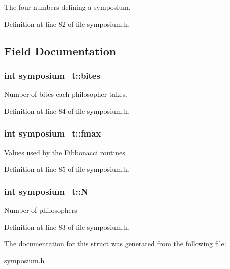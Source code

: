 The four numbers defining a symposium. 

Definition at line 82 of file symposium.\-h.



\subsection{Field Documentation}
\hypertarget{structsymposium__t_a9ee1b978200b8a4b7c30b170c1f20643}{
\subsubsection[{bites}]{\setlength{\rightskip}{0pt plus 5cm}int symposium\-\_\-t\-::bites}}\label{structsymposium__t_a9ee1b978200b8a4b7c30b170c1f20643}
Number of bites each philosopher takes. 

Definition at line 84 of file symposium.\-h.

\hypertarget{structsymposium__t_a038b49a350225fed31d5c148a9147ec6}{
\subsubsection[{fmax}]{\setlength{\rightskip}{0pt plus 5cm}int symposium\-\_\-t\-::fmax}}\label{structsymposium__t_a038b49a350225fed31d5c148a9147ec6}
Values used by the Fibbonacci routines 

Definition at line 85 of file symposium.\-h.

\hypertarget{structsymposium__t_a4e366c10036b2d89ebc2dbcdefba8999}{
\subsubsection[{N}]{\setlength{\rightskip}{0pt plus 5cm}int symposium\-\_\-t\-::\-N}}\label{structsymposium__t_a4e366c10036b2d89ebc2dbcdefba8999}
Number of philosophers 

Definition at line 83 of file symposium.\-h.



The documentation for this struct was generated from the following file\-:\begin{DoxyCompactItemize}
\item 
\hyperlink{symposium_8h}{symposium.\-h}\end{DoxyCompactItemize}
